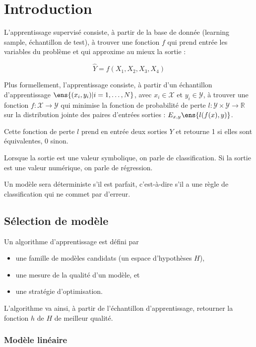 \chapter{Introduction}
L'apprentissage supervisé consiste, à partir de la base de donnée (learning sample, échantillon de test), à trouver une fonction $f$ qui prend entrée les variables du problème et qui approxime au mieux la sortie :

$$\hat{Y} = f(X_1, X_2, X_3, X_4)$$

Plus formellement, l'apprentissage consiste, à partir d'un échantillon d'apprentissage $\ens{(x_i, y_i) \vert i = 1, \dots , N}$, avec $x_i \in \mathcal{X}$ et $y_i \in \mathcal{Y}$, à trouver une fonction $f : \mathcal{X} \rightarrow \mathcal{Y}$ qui minimise la fonction de probabilité de perte $l : \mathcal{Y} \times \mathcal{Y} \rightarrow \mathbb{R}$ sur la distribution jointe des paires d'entrées sorties : $E_{x, y} \ens{l(f(x), y)}$.

Cette fonction de perte $l$ prend en entrée deux sorties $Y$ et retourne 1 si elles sont équivalentes, 0 sinon.

Lorsque la sortie est une valeur symbolique, on parle de classification. Si la sortie est une valeur numérique, on parle de régression.

Un modèle sera déterministe s'il est parfait, c'est-à-dire s'il a une règle de classification qui ne commet par d'erreur.

\section{Sélection de modèle}

Un algorithme d'apprentissage est défini par

\begin{itemize}
	\item une famille de modèles candidats (un espace d'hypothèses $H$),
	\item une mesure de la qualité d'un modèle, et
	\item une stratégie d'optimisation.
\end{itemize}

L'algorithme va ainsi, à partir de l'échantillon d'apprentissage, retourner la fonction $h$ de $H$ de meilleur qualité.

\subsection{Modèle linéaire}

